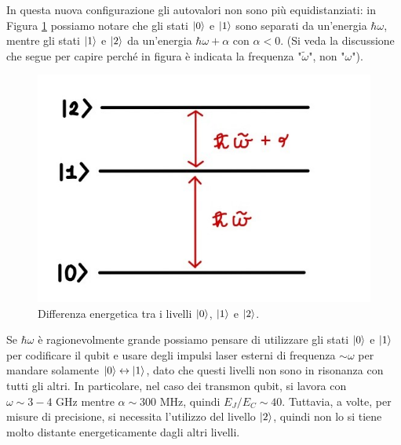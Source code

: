 \noindent In questa nuova configurazione gli autovalori non sono più equidistanziati: in Figura \ref{fig:energy-difference-transmon} possiamo notare che gli stati $\ket 0$ e $\ket 1$ sono separati da un'energia $\hbar\omega$, mentre gli stati $\ket 1$ e $\ket 2$ da un'energia $\hbar\omega+\alpha$ con $\alpha<0$. (Si veda la discussione che segue per capire perché in figura è indicata la frequenza "$\tilde{\omega}$", non "$\omega$"). 

\begin{figure}[H]
	\centering	
	\includegraphics[scale=.45, keepaspectratio]{images/energy-difference-transmon.jpg}
	\caption{Differenza energetica tra i livelli $\ket 0$, $\ket 1$ e $\ket 2$.}
	\label{fig:energy-difference-transmon}
\end{figure}

\noindent Se $\hbar \omega$ è ragionevolmente grande possiamo pensare di utilizzare gli stati $\ket{0}$ e $\ket{1}$ per codificare il qubit e usare degli impulsi laser esterni di frequenza $\sim \omega$ per mandare solamente $\ket{0} \leftrightarrow \ket{1}$, dato che questi livelli non sono in risonanza con tutti gli altri. In particolare, nel caso dei transmon qubit, si lavora con $\omega \sim 3-4 \text{ GHz}$ mentre $\alpha \sim 300 \text{ MHz}$, quindi $E_J/E_C \sim 40$. Tuttavia, a volte, per misure di precisione, si necessita l'utilizzo del livello $\ket 2$, quindi non lo si tiene molto distante energeticamente dagli altri livelli.

